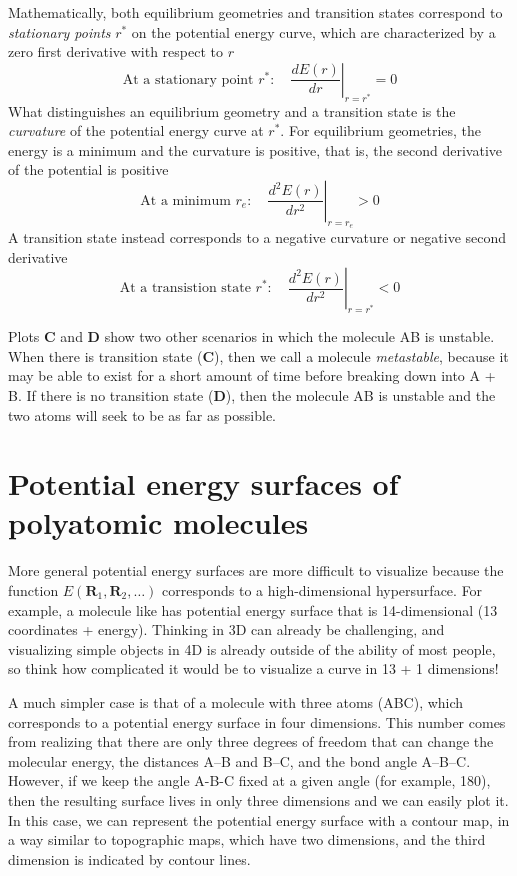 \documentclass[../Main/chem371-notes.tex]{subfiles}
\begin{document}
Mathematically, both equilibrium geometries and transition states correspond to \emph{stationary points} $r^*$ on the potential energy curve, which are characterized by a zero first derivative with respect to $r$
\begin{equation}
\text{At a stationary point } r^*: \quad \left.\frac{d E(r)}{dr}\right|_{r = r^*} = 0
\end{equation}
What distinguishes an equilibrium geometry and a transition state is the \emph{curvature} of the potential energy curve at $r^*$.
For equilibrium geometries, the energy is a minimum and the curvature is positive, that is, the second derivative of the potential is positive
\begin{equation}
\text{At a minimum } r_e: \quad \left.\frac{d^2 E(r)}{dr^2}\right|_{r = r_e} > 0
\end{equation}
A transition state instead corresponds to a negative curvature or negative second derivative
\begin{equation}
\text{At a transistion state } r^*: \quad \left.\frac{d^2 E(r)}{dr^2}\right|_{r = r^*} < 0
\end{equation}

Plots \textbf{C} and \textbf{D} show two other scenarios in which the molecule AB is unstable.
When there is transition state (\textbf{C}), then we call a molecule \emph{metastable}, because it may be able to exist for a short amount of time before breaking down into A + B.
If there is no transition state (\textbf{D}), then the molecule AB is unstable and the two atoms will seek to be as far as possible.



\section{Potential energy surfaces of polyatomic molecules}

More general potential energy surfaces are more difficult to visualize because  the function $E(\mathbf{R}_1,  \mathbf{R}_2,\ldots)$ corresponds to a high-dimensional hypersurface.
For example, a molecule like  has potential energy surface that is 14-dimensional (13 coordinates + energy). Thinking in 3D can already be challenging, and visualizing simple objects in 4D is already outside of the ability of most people, so think how complicated it would be to visualize a curve in 13 + 1 dimensions! 

A much simpler case is that of a molecule with three atoms (ABC), which corresponds to a potential energy surface in four dimensions. This number comes from realizing that there are only three degrees of freedom that can change the molecular energy, the distances A--B and B--C, and the bond angle A--B--C.
However, if we keep the angle A-B-C fixed at a given angle (for example, 180\textdegree), then the resulting surface lives in only three dimensions and we can easily plot it.
In this case, we can represent the potential energy surface with a contour map, in a way similar to topographic maps, which have two dimensions, and the third dimension is indicated by contour lines.
\end{document}
